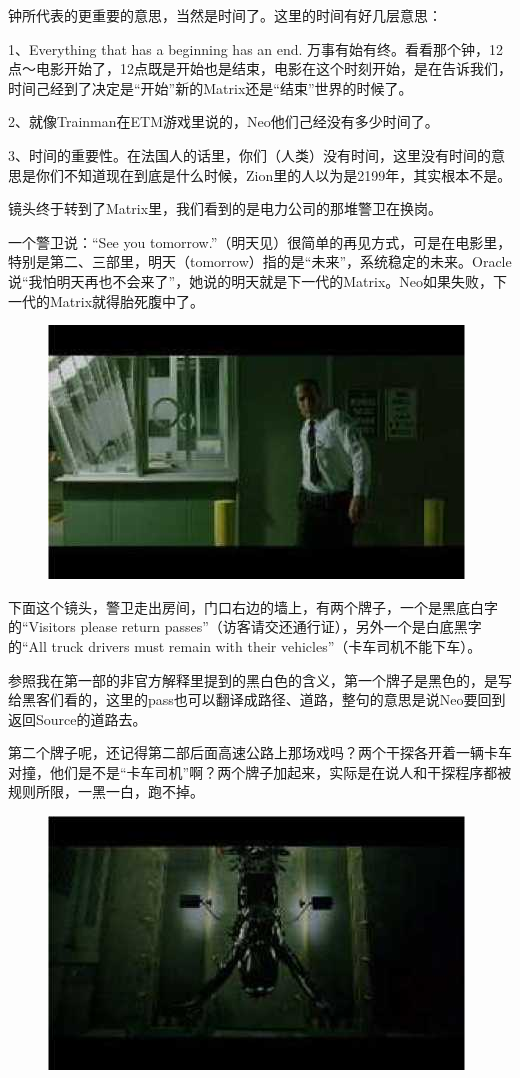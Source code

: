 \documentclass{ctexart}
\begin{document}
钟所代表的更重要的意思，当然是时间了。这里的时间有好几层意思：

1、Everything that has a beginning has an end. 万事有始有终。看看那个钟，12点～电影开始了，12点既是开始也是结束，电影在这个时刻开始，是在告诉我们，时间己经到了决定是“开始”新的Matrix还是“结束”世界的时候了。

2、就像Trainman在ETM游戏里说的，Neo他们己经没有多少时间了。

3、时间的重要性。在法国人的话里，你们（人类）没有时间，这里没有时间的意思是你们不知道现在到底是什么时候，Zion里的人以为是2199年，其实根本不是。

镜头终于转到了Matrix里，我们看到的是电力公司的那堆警卫在换岗。

一个警卫说：“See you tomorrow.”（明天见）很简单的再见方式，可是在电影里，特别是第二、三部里，明天（tomorrow）指的是“未来”，系统稳定的未来。Oracle说“我怕明天再也不会来了”，她说的明天就是下一代的Matrix。Neo如果失败，下一代的Matrix就得胎死腹中了。

\begin{figure}[htb]
\centering
\includegraphics[width=0.5\linewidth]{fig/read_reloaded-5}
\end{figure}

下面这个镜头，警卫走出房间，门口右边的墙上，有两个牌子，一个是黑底白字的“Visitors please return passes”（访客请交还通行证），另外一个是白底黑字的“All truck drivers must remain with their vehicles”（卡车司机不能下车）。

参照我在第一部的非官方解释里提到的黑白色的含义，第一个牌子是黑色的，是写给黑客们看的，这里的pass也可以翻译成路径、道路，整句的意思是说Neo要回到返回Source的道路去。

第二个牌子呢，还记得第二部后面高速公路上那场戏吗？两个干探各开着一辆卡车对撞，他们是不是“卡车司机”啊？两个牌子加起来，实际是在说人和干探程序都被规则所限，一黑一白，跑不掉。

\begin{figure}[htb]
\centering
\includegraphics[width=0.5\linewidth]{fig/read_reloaded-6}
\end{figure}
\end{document}
